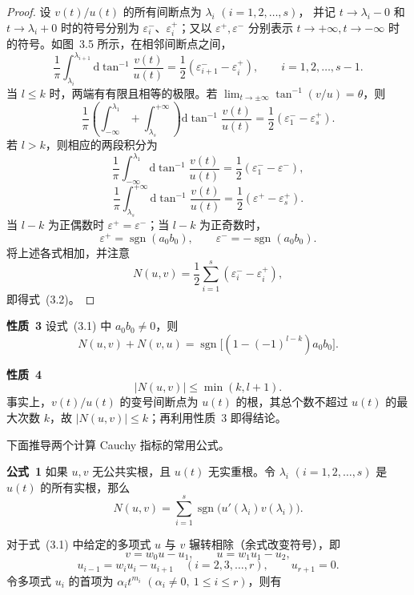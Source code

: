 \begin{proof}
设 $v(t)/u(t)$ 的所有间断点为 $\lambda_i$ $(i=1,2,\ldots,s)$，
并记 $t\to\lambda_i-0$ 和 $t\to\lambda_i+0$ 时的符号分别为
$\varepsilon_i^-$、$\varepsilon_i^+$；又以
$\varepsilon^+,\varepsilon^-$ 分别表示 $t\to+\infty,t\to-\infty$
时的符号。如图~3.5 所示，在相邻间断点之间，
\[
  \dfrac{1}{\pi}\int_{\lambda_i}^{\lambda_{i+1}}
  \mathrm{d}\tan^{-1}\dfrac{v(t)}{u(t)}
  =\dfrac12(\varepsilon_{i+1}^--\varepsilon_i^+),
  \qquad i=1,2,\ldots,s-1. \tag{3.3}
\]
当 $l\leq k$ 时，两端有有限且相等的极限。若
$\lim_{t\to\pm\infty}\tan^{-1}(v/u)=\theta$，则
\[
  \dfrac{1}{\pi}\left(
    \int_{-\infty}^{\lambda_1}+\int_{\lambda_s}^{+\infty}
  \right)\mathrm{d}\tan^{-1}\dfrac{v(t)}{u(t)}
  =\dfrac12(\varepsilon_1^--\varepsilon_s^+). \tag{3.4}
\]
若 $l>k$，则相应的两段积分为
\[
  \dfrac{1}{\pi}\int_{-\infty}^{\lambda_1}
  \mathrm{d}\tan^{-1}\dfrac{v(t)}{u(t)}
  =\dfrac12(\varepsilon_1^--\varepsilon^-),
\]
\[
  \dfrac{1}{\pi}\int_{\lambda_s}^{+\infty}
  \mathrm{d}\tan^{-1}\dfrac{v(t)}{u(t)}
  =\dfrac12(\varepsilon^+-\varepsilon_s^+). \tag{3.5}
\]
当 $l-k$ 为正偶数时 $\varepsilon^+=\varepsilon^-$；当 $l-k$
为正奇数时，
\[
  \varepsilon^+=\operatorname{sgn}(a_0b_0),\qquad
  \varepsilon^-=-\operatorname{sgn}(a_0b_0).
\]
将上述各式相加，并注意
\[
  N(u,v)=\dfrac12\sum_{i=1}^s(\varepsilon_i^--\varepsilon_i^+),
\]
即得式~(3.2)。
\end{proof}


\noindent\textbf{性质~3}\quad
设式~(3.1) 中 $a_0b_0\ne0$，则
\[
  N(u,v)+N(v,u)
  =\operatorname{sgn}\bigl[(1-(-1)^{l-k})a_0b_0\bigr].
\]

\noindent\textbf{性质~4}\quad
\[
  \lvert N(u,v)\rvert\leq\min(k,l+1).
\]
事实上，$v(t)/u(t)$ 的变号间断点为 $u(t)$ 的根，其总个数不超过
$u(t)$ 的最大次数 $k$，故 $|N(u,v)|\leq k$；再利用性质~3 即得结论。

下面推导两个计算 Cauchy 指标的常用公式。

\noindent\textbf{公式~1}\quad
如果 $u,v$ 无公共实根，且 $u(t)$ 无实重根。令
$\lambda_i$ $(i=1,2,\ldots,s)$ 是 $u(t)$ 的所有实根，那么
\[
  N(u,v)=\sum_{i=1}^s
  \operatorname{sgn}\bigl(u'(\lambda_i)v(\lambda_i)\bigr).
\]

对于式~(3.1) 中给定的多项式 $u$ 与 $v$ 辗转相除（余式改变符号），即
\[
  v=w_0u-u_1,\qquad u=w_1u_1-u_2,
\]
\[
  u_{i-1}=w_iu_i-u_{i+1}\quad(i=2,3,\ldots,r),\qquad
  u_{r+1}=0.
\]
令多项式 $u_i$ 的首项为
$\alpha_it^{m_i}$ $(\alpha_i\ne0,\ 1\leq i\leq r)$，则有

